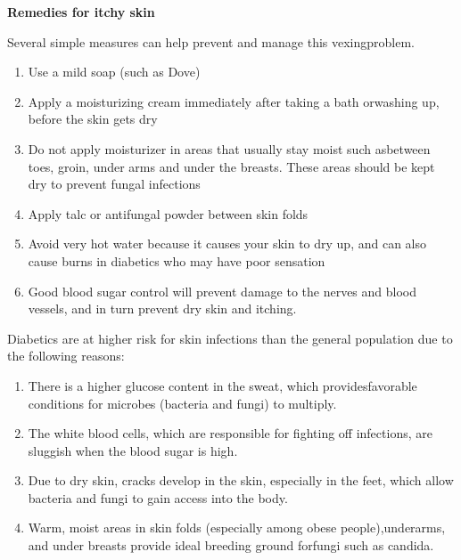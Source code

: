 \noindent\textbf{Remedies for itchy skin}

\noindent Several simple measures can help prevent and manage this vexing\break problem.

\vspace{-\topsep}
\begin{enumerate}[•]
\itemsep=0pt
\item Use a mild soap (such as Dove)
\item Apply a moisturizing cream immediately after taking a bath or\break washing up, before the skin gets dry
\item Do not apply moisturizer in areas that usually stay moist such as\break between toes, groin, under arms and under the breasts. These areas should be kept dry to prevent fungal infections
\item Apply talc or antifungal powder between skin folds
\item Avoid very hot water because it causes your skin to dry up, and can also cause burns in diabetics who may have poor sensation
\item Good blood sugar control will prevent damage to the nerves and blood vessels, and in turn prevent dry skin and itching.
\end{enumerate}
\vspace{-\topsep}


Diabetics are at higher risk for skin infections than the general popu\-lation due to the following reasons:

\vspace{-\topsep}
\begin{enumerate}[•]
\itemsep=0pt
\item There is a higher glucose content in the sweat, which provides\break favorable conditions for microbes (bacteria and fungi) to multiply.
\item The white blood cells, which are responsible for fighting off infe\-ctions, are sluggish when the blood sugar is high.
\item Due to dry skin, cracks develop in the skin, especially in the feet, which allow bacteria and fungi to gain access into the body.
\item Warm, moist areas in skin folds (especially among obese people),\break underarms, and under breasts provide ideal breeding ground for\break fungi such as candida.
\end{enumerate}
\vspace{-\topsep}

